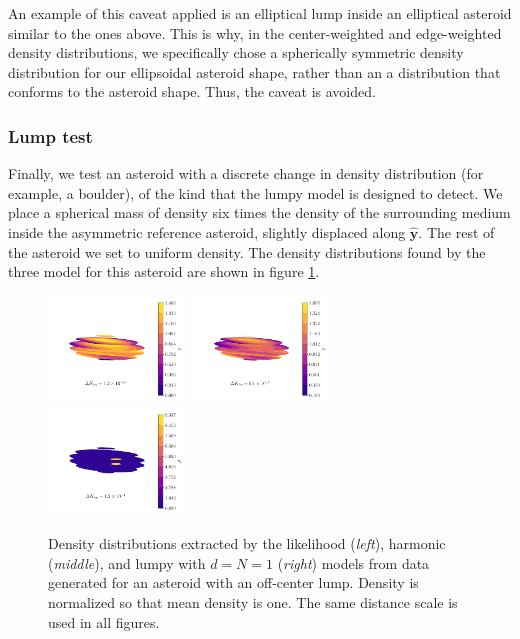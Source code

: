 \documentclass[fleqn,usenatbib]{mnras}
\newcommand{\unit}[1]{\bm{\hat{#1}}}
\begin{document}
An example of this caveat applied is an elliptical lump inside an elliptical asteroid similar to the ones above. This is why, in the center-weighted and edge-weighted density distributions, we specifically chose a spherically symmetric density distribution for our ellipsoidal asteroid shape, rather than an a distribution that conforms to the asteroid shape. Thus, the caveat is avoided.



\subsubsection{Lump test}

Finally, we test an asteroid with a discrete change in density distribution (for example, a boulder), of the kind that the lumpy model is designed to detect. We place a spherical mass of density six times the density of the surrounding medium inside the asymmetric reference asteroid, slightly displaced along $\unit y$. The rest of the asteroid we set to uniform density. The density distributions found by the three model for this asteroid are shown in figure \ref{fig:blob-density}.

\begin{figure}
  \centering
  \includegraphics[width=0.33\textwidth]{figs/blob-likelihood.pdf}\hfill
  \includegraphics[width=0.33\textwidth]{figs/blob-harmonic.pdf}\hfill
  \includegraphics[width=0.33\textwidth]{figs/blob-lumpy.pdf}

  \caption{Density distributions extracted by the likelihood (\textit{left}), harmonic (\textit{middle}), and lumpy with $d=N=1$ (\textit{right}) models from data generated for an asteroid with an off-center lump. Density is normalized so that mean density is one. The same distance scale is used in all figures.}
  \label{fig:blob-density}
\end{figure}
\end{document}
